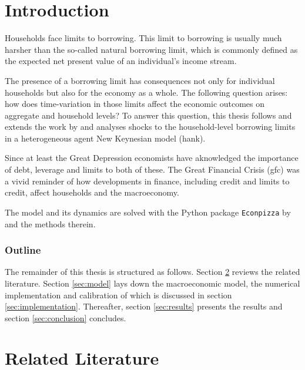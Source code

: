\documentclass[12pt]{article}
\numberwithin{equation}{section} %
\begin{document}
\newpage
{} %
\pagestyle{fancy}
\fancyhf{}
\fancyhead[C]{\leftmark}
\fancyfoot[C]{\thepage}
\thispagestyle{plain}
\section{Introduction}
\label{sec:introduction}

Households face limits to borrowing. This limit to borrowing is usually much harsher than the so-called natural borrowing limit, which is commonly defined as the expected net present value of an individual's income stream.

The presence of a borrowing limit has consequences not only for individual households but also for the economy as a whole. The following question arises: how does time-variation in those limits affect the economic outcomes on aggregate and household levels? To answer this question, this thesis follows and extends the work by \textcite{gl2017} and analyses shocks to the household-level borrowing limits in a heterogeneous agent New Keynesian model (\Gls{hank}).

Since at least the Great Depression economists have aknowledged the importance of debt, leverage and limits to both of these. The Great Financial Crisis (\Gls{gfc}) was a vivid reminder of how developments in finance, including credit and limits to credit, affect households and the macroeconomy. 

The model and its dynamics are solved with the Python package \texttt{Econpizza} by \textcite{boehl2023econpizza} and the methods therein.

\subsubsection*{Outline}
\label{sec:outline}
The remainder of this thesis is structured as follows. Section \ref{sec:literature} reviews the related literature. Section \ref{sec:model} lays down the macroeconomic model, the numerical implementation and calibration of which is discussed in section \ref{sec:implementation}. Thereafter, section \ref{sec:results} presents the results and section \ref{sec:conclusion} concludes.

\section{Related Literature}
\label{sec:literature}
\end{document}
